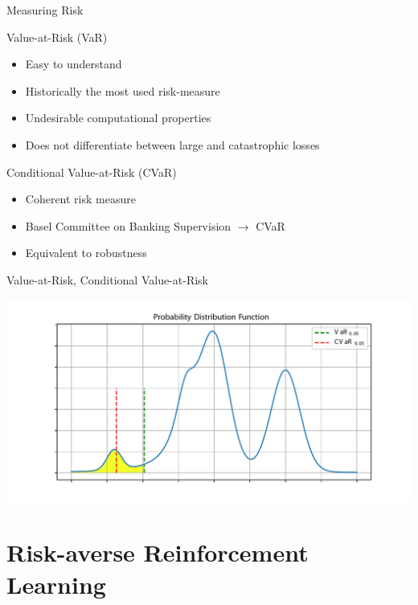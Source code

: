 \documentclass{beamer}
\begin{document}
\begin{frame}{Measuring Risk}
\begin{block}{Value-at-Risk (VaR)}
\begin{itemize}
\item Easy to understand
\item Historically the most used risk-measure
\item Undesirable computational properties
\item Does not differentiate between large and catastrophic losses
\end{itemize}

\end{block}

\begin{block}{Conditional Value-at-Risk (CVaR)}
\begin{itemize}
\item Coherent risk measure
\item Basel Committee on Banking Supervision $\to$ CVaR
\item Equivalent to robustness
\end{itemize}


\end{block}

\end{frame}



\begin{frame}{Value-at-Risk, Conditional Value-at-Risk}

\includegraphics[width=\linewidth]{../gfx/pdf.pdf}

\end{frame}



\section{Risk-averse Reinforcement Learning}
\end{document}
